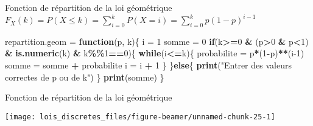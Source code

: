 \documentclass[
  ignorenonframetext,
]{beamer}
\newenvironment{Shaded}{\begin{snugshade}}{\end{snugshade}}
\newcommand{\ControlFlowTok}[1]{\textcolor[rgb]{0.13,0.29,0.53}{\textbf{#1}}}
\newcommand{\DecValTok}[1]{\textcolor[rgb]{0.00,0.00,0.81}{#1}}
\newcommand{\FunctionTok}[1]{\textcolor[rgb]{0.13,0.29,0.53}{\textbf{#1}}}
\newcommand{\NormalTok}[1]{#1}
\newcommand{\OtherTok}[1]{\textcolor[rgb]{0.56,0.35,0.01}{#1}}
\newcommand{\SpecialCharTok}[1]{\textcolor[rgb]{0.81,0.36,0.00}{\textbf{#1}}}
\newcommand{\StringTok}[1]{\textcolor[rgb]{0.31,0.60,0.02}{#1}}
\begin{document}
\begin{frame}[fragile]{Fonction de répartition de la loi géométrique}
\protect\hypertarget{fonction-de-ruxe9partition-de-la-loi-guxe9omuxe9trique}{}
\(F_X (k) = P(X\le k) = \sum_{i=0}^k P(X=i) = \sum_{i=0}^k p(1-p)^{i-1}\)

\begin{Shaded}
\begin{Highlighting}[]
\NormalTok{repartition.geom }\OtherTok{=} \ControlFlowTok{function}\NormalTok{(p, k)\{}
\NormalTok{  i }\OtherTok{=} \DecValTok{1}
\NormalTok{  somme }\OtherTok{=} \DecValTok{0}
  \ControlFlowTok{if}\NormalTok{(k}\SpecialCharTok{\textgreater{}=}\DecValTok{0} \SpecialCharTok{\&}\NormalTok{  (p}\SpecialCharTok{\textgreater{}}\DecValTok{0} \SpecialCharTok{\&}\NormalTok{ p}\SpecialCharTok{\textless{}}\DecValTok{1}\NormalTok{) }\SpecialCharTok{\&}  \FunctionTok{is.numeric}\NormalTok{(k) }\SpecialCharTok{\&}\NormalTok{ k}\SpecialCharTok{\%\%}\DecValTok{1}\SpecialCharTok{==}\DecValTok{0}\NormalTok{)\{}
    \ControlFlowTok{while}\NormalTok{(i}\SpecialCharTok{\textless{}=}\NormalTok{k)\{}
\NormalTok{      probabilite }\OtherTok{=}\NormalTok{ p}\SpecialCharTok{*}\NormalTok{(}\DecValTok{1}\SpecialCharTok{{-}}\NormalTok{p)}\SpecialCharTok{**}\NormalTok{(i}\DecValTok{{-}1}\NormalTok{)}
\NormalTok{      somme }\OtherTok{=}\NormalTok{ somme }\SpecialCharTok{+}\NormalTok{ probabilite}
\NormalTok{      i }\OtherTok{=}\NormalTok{ i }\SpecialCharTok{+} \DecValTok{1}
\NormalTok{      \}}
\NormalTok{    \}}\ControlFlowTok{else}\NormalTok{\{}
    \FunctionTok{print}\NormalTok{(}\StringTok{"Entrer des valeurs correctes de p ou de k"}\NormalTok{)}
\NormalTok{    \}}
 \FunctionTok{print}\NormalTok{(somme)}
\NormalTok{\}}
\end{Highlighting}
\end{Shaded}
\end{frame}

\begin{frame}{Fonction de répartition de la loi géométrique}
\protect\hypertarget{fonction-de-ruxe9partition-de-la-loi-guxe9omuxe9trique-1}{}
\begin{center}\texttt{[image: lois\_discretes\_files/figure-beamer/unnamed-chunk-25-1]} \end{center}
\end{frame}
\end{document}
